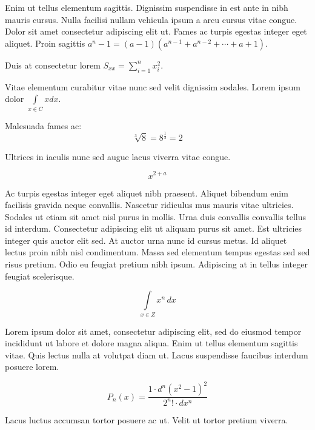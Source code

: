 \documentclass{article}
\begin{document}
Enim ut tellus elementum sagittis. Dignissim suspendisse in est ante in nibh mauris cursus. Nulla facilisi nullam vehicula ipsum a arcu cursus vitae congue. Dolor sit amet consectetur adipiscing elit ut. Fames ac turpis egestas integer eget aliquet. Proin sagittis \begin{math}
	a^n-1=(a-1)(a^{n-1}+a^{n-2}+\cdots+a+1)
\end{math}.\newline

Duis at consectetur lorem $ S_{xx}=\sum_{i=1}^{n}x_i^2 $.\newline

Vitae elementum curabitur vitae nunc sed velit dignissim sodales. Lorem ipsum dolor \( \int\limits_{x\in C}xdx \).\newline

Malesuada fames ac: \[ \sqrt[3]{8}=8^{\frac{1}{3}}=2 \]

Ultrices in iaculis nunc sed augue lacus viverra vitae congue.

$$ x^{2+a} $$

Ac turpis egestas integer eget aliquet nibh praesent. Aliquet bibendum enim facilisis gravida neque convallis. Nascetur ridiculus mus mauris vitae ultricies. Sodales ut etiam sit amet nisl purus in mollis. Urna duis convallis convallis tellus id interdum. Consectetur adipiscing elit ut aliquam purus sit amet. Est ultricies integer quis auctor elit sed. At auctor urna nunc id cursus metus. Id aliquet lectus proin nibh nisl condimentum. Massa sed elementum tempus egestas sed sed risus pretium. Odio eu feugiat pretium nibh ipsum. Adipiscing at in tellus integer feugiat scelerisque.

\begin{displaymath}
	\int\limits_{x\in Z}\! x^{n}\, dx
\end{displaymath}

Lorem ipsum dolor sit amet, consectetur adipiscing elit, sed do eiusmod tempor incididunt ut labore et dolore magna aliqua. Enim ut tellus elementum sagittis vitae. Quis lectus nulla at volutpat diam ut. Lacus suspendisse faucibus interdum posuere lorem. 

\begin{equation}
	P_n\left ( x \right ) = \frac{1 \cdot d^n\left ( x^2-1 \right )^2}{2^n ! \cdot dx^n}
\end{equation}

Lacus luctus accumsan tortor posuere ac ut. Velit ut tortor pretium viverra.
\end{document}
